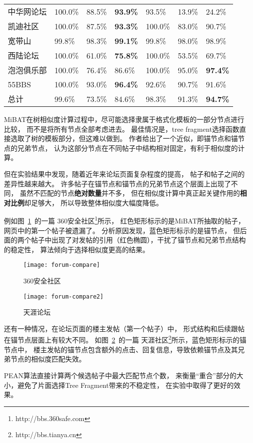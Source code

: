 \begin{table}[t]
\begin{tabular}{lllllll}
中华网论坛 & 100.0\% & 88.5\% & \textbf{93.9\%} & 93.5\% & 13.9\% & 24.2\% \\
凯迪社区 & 100.0\% & 87.5\% & \textbf{93.3\%} & 100.0\% & 83.0\% & 90.7\% \\
宽带山 & 99.8\% & 98.3\% & \textbf{99.1\%} & 99.8\% & 98.0\% & 98.9\% \\
西陆论坛 & 100.0\% & 61.0\% & \textbf{75.8\%} & 100.0\% & 53.5\% & 69.7\% \\
泡泡俱乐部 & 100.0\% & 76.4\% & 86.6\% & 100.0\% & 95.0\% & \textbf{97.4\%} \\ 
55BBS & 100.0\% & 93.0\% & \textbf{96.4\%} & 92.6\% & 90.7\% & 91.6\% \\
总计 & 99.6\% & 73.5\% & 84.6\% & 98.3\% & 91.3\% & \textbf{94.7\%} \\
\bottomrule[1.5pt]
\end{tabular}
\end{table}

MiBAT在树相似度计算过程中，尽可能选择隶属于格式化模板的一部分节点进行比较，
而不是将所有节点全部考虑进去。
最佳情况是，tree fragment选择函数直接选取了树的模板部分，但这难以做到。
作者给出了一个近似，即锚节点和锚节点的兄弟节点，
认为这部分节点在不同帖子中结构相对固定，有利于相似度的计算。

但在实验结果中发现，随着近年来论坛页面复杂程度的提高，
帖子和帖子之间的差异性越来越大。
许多帖子在锚节点和锚节点的兄弟节点这个层面上出现了不同，
虽然不匹配的节点\textbf{绝对数量}并不多，
但在相似度计算中真正起关键作用的\textbf{相对比例}却足够大，
所以导致整体相似度大幅度降低。

例如图~\ref{fig:forum-compare}~的一篇
360安全社区\footnote{http://bbs.360safe.com}所示，
红色矩形标示的是MiBAT所抽取的帖子，网页中的第一个帖子被遗漏了。
分析原因发现，蓝色矩形标示的是锚节点，
但后面的两个帖子中出现了对发帖的引用（红色椭圆），干扰了锚节点和兄弟节点结构的稳定性，
算法倾向于选择相似度更高的结果。

\begin{figure}[htbp]
\centering
\texttt{[image: forum-compare]}
\caption{360安全社区}
\label{fig:forum-compare}
\end{figure}

\begin{figure}[htbp]
\centering
\texttt{[image: forum-compare2]}
\caption{天涯论坛}
\label{fig:forum-compare2}
\end{figure}

还有一种情况，在论坛页面的楼主发帖（第一个帖子）中，
形式结构和后续跟帖在锚节点层面上有较大不同。
如图~\ref{fig:forum-compare2}~的一篇
天涯社区\footnote{http://bbs.tianya.cn}所示，蓝色矩形标示的锚节点中，
楼主发帖的锚节点包含额外的点击、回复信息，导致依赖锚节点及其兄弟节点的相似度匹配失效。

PEAN算法直接计算两个候选帖子中最大匹配节点个数，
来衡量“重合”部分的大小，避免了片面选择Tree Fragment带来的不稳定性，
在实验中取得了更好的效果。
